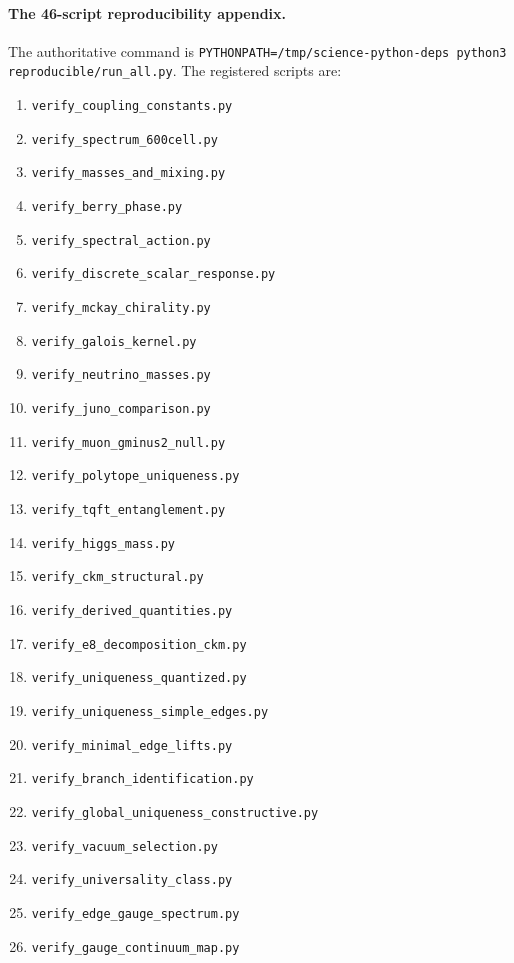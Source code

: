 \documentclass[12pt,a4paper]{article}
\theoremstyle{definition}
\begin{document}
\paragraph{The 46-script reproducibility appendix.}
The authoritative command is
\texttt{PYTHONPATH=/tmp/science-python-deps python3 reproducible/run\_all.py}.
The registered scripts are:
\begin{enumerate}\scriptsize
\item \texttt{verify\_coupling\_constants.py}
\item \texttt{verify\_spectrum\_600cell.py}
\item \texttt{verify\_masses\_and\_mixing.py}
\item \texttt{verify\_berry\_phase.py}
\item \texttt{verify\_spectral\_action.py}
\item \texttt{verify\_discrete\_scalar\_response.py}
\item \texttt{verify\_mckay\_chirality.py}
\item \texttt{verify\_galois\_kernel.py}
\item \texttt{verify\_neutrino\_masses.py}
\item \texttt{verify\_juno\_comparison.py}
\item \texttt{verify\_muon\_gminus2\_null.py}
\item \texttt{verify\_polytope\_uniqueness.py}
\item \texttt{verify\_tqft\_entanglement.py}
\item \texttt{verify\_higgs\_mass.py}
\item \texttt{verify\_ckm\_structural.py}
\item \texttt{verify\_derived\_quantities.py}
\item \texttt{verify\_e8\_decomposition\_ckm.py}
\item \texttt{verify\_uniqueness\_quantized.py}
\item \texttt{verify\_uniqueness\_simple\_edges.py}
\item \texttt{verify\_minimal\_edge\_lifts.py}
\item \texttt{verify\_branch\_identification.py}
\item \texttt{verify\_global\_uniqueness\_constructive.py}
\item \texttt{verify\_vacuum\_selection.py}
\item \texttt{verify\_universality\_class.py}
\item \texttt{verify\_edge\_gauge\_spectrum.py}
\item \texttt{verify\_gauge\_continuum\_map.py}

\end{enumerate}
\end{document}
